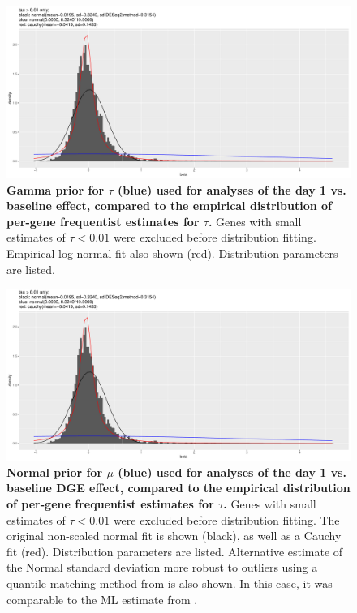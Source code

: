 \begin{figure}
    \includegraphics[width=1.0\textwidth,page=2]{mainmatter/figures/chapter_02/meta.bayesmeta.priors.coefName_d1.vs.d0.pdf}
    \caption{
        \textbf{Gamma prior for $\tau$ (blue) used for  analyses of the day 1 vs. baseline effect, compared to the empirical distribution of per-gene frequentist  estimates for $\tau$.}
        Genes with small estimates of $\tau < 0.01$ were excluded before distribution fitting.
        Empirical log-normal fit also shown (red).
        Distribution parameters are listed.
    }
    \label{fig:hird_dgeMeta_priors_tau}
\end{figure}

\begin{figure}
    \includegraphics[width=1.0\textwidth,page=1]{mainmatter/figures/chapter_02/meta.bayesmeta.priors.coefName_d1.vs.d0.pdf}
    \caption{
        \textbf{Normal prior for $\mu$ (blue) used for  analyses of the day 1 vs. baseline \gls{DGE} effect, compared to the empirical distribution of per-gene frequentist  estimates for $\tau$.}
        Genes with small estimates of $\tau < 0.01$ were excluded before distribution fitting.
        The original non-scaled normal fit is shown (black), as well as a Cauchy fit (red).
        Distribution parameters are listed.
        Alternative estimate of the Normal standard deviation more robust to outliers using a quantile matching method from  \autocite{love2014ModeratedEstimationFold} is also shown.
        In this case, it was comparable to the \gls{ML} estimate from .
    }
    \label{fig:hird_dgeMeta_priors_mu}
\end{figure}

